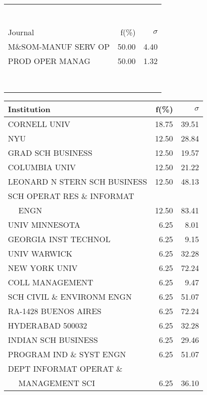 \documentclass[a4paper,11pt]{report}
\begin{document}
\begin{landscape}
\begin{table}[!ht]
{\begin{tabular}{|l r  r|}
 &  & \\
 &  & \\
 &  & \\
 &  & \\
 &  & \\
 &  & \\
 &  & \\
\hline
\hline
Journal & f(\%) & $\sigma$\\
\hline
M\&SOM-MANUF SERV OP & 50.00 & 4.40\\
PROD OPER MANAG & 50.00 & 1.32\\
 &  & \\
 &  & \\
 &  & \\
 &  & \\
 &  & \\
 &  & \\
 &  & \\
 &  & \\
\hline
\end{tabular}
}
{\scriptsize\begin{tabular}{|l r r|}
\hline
Institution & f(\%) & $\sigma$\\
\hline
CORNELL UNIV & 18.75 & 39.51\\
NYU & 12.50 & 28.84\\
GRAD SCH BUSINESS & 12.50 & 19.57\\
COLUMBIA UNIV & 12.50 & 21.22\\
LEONARD N STERN SCH BUSINESS & 12.50 & 48.13\\
SCH OPERAT RES \& INFORMAT &  & \\
$\quad$ ENGN & 12.50 & 83.41\\
UNIV MINNESOTA & 6.25 & 8.01\\
GEORGIA INST TECHNOL & 6.25 & 9.15\\
UNIV WARWICK & 6.25 & 32.28\\
NEW YORK UNIV & 6.25 & 72.24\\
COLL MANAGEMENT & 6.25 & 9.47\\
SCH CIVIL \& ENVIRONM ENGN & 6.25 & 51.07\\
RA-1428 BUENOS AIRES & 6.25 & 72.24\\
HYDERABAD 500032 & 6.25 & 32.28\\
INDIAN SCH BUSINESS & 6.25 & 29.46\\
PROGRAM IND \& SYST ENGN & 6.25 & 51.07\\
DEPT INFORMAT OPERAT \& &  & \\
$\quad$ MANAGEMENT SCI & 6.25 & 36.10\\

\end{tabular}}
\end{table}
\end{landscape}
\end{document}
